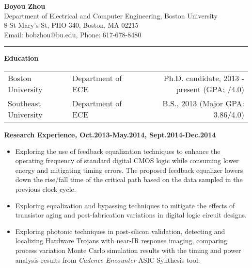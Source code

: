 \documentclass[]{article}
\begin{document}
\pagestyle{empty}
\begin{center}
\vspace{-0.2in}
{\large\textbf{Boyou Zhou}}\\
Department of Electrical and Computer Engineering, Boston University\\
8 St Mary's St, PHO 340, Boston, MA 02215\\
Email: bobzhou@bu.edu, Phone: 617-678-8480\\
\rule[-0.1cm]{7.5in}{0.01cm}
\end{center}
%

\textbf{Education}
\vspace{-0.1in}
\begin{table*}[h]
  \begin{tabular}{p{2.0in}p{2.0in}r}
    Boston University& Department of ECE & Ph.D. candidate, 2013 - present
    (GPA: /4.0)\\ 
    Southeast University & Department of ECE & B.S., 2013
    (Major GPA: 3.86/4.0)\\ 
  \end{tabular}
  \label{tbl:1}
\end{table*}

\vspace{-0.1in}
\noindent \textbf{Research Experience, Oct.2013-May.2014, Sept.2014-Dec.2014}
		\begin{itemize}
            \item Exploring the use of feedback equalization techniques to
            enhance the operating frequency of standard digital CMOS logic
            while consuming lower energy and mitigating timing errors. The
            proposed feedback equalizer lowers down the rise/fall time of
            the critical path based on the data sampled in the previous
            clock cycle. 

            \item Exploring equalization and bypassing techniques to mitigate
            the effects of transistor aging and post-fabrication
            variations in digital logic circuit designs.

            \item Exploring photonic techniques in post-silicon validation,
            detecting and localizing Hardware Trojans with near-IR response
            imaging, comparing process variation Monte Carlo simulation results
            with the timing and power analysis results from \textit{Cadence
            Encounter} ASIC Synthesis tool. 
		\end{itemize}
\end{document}

